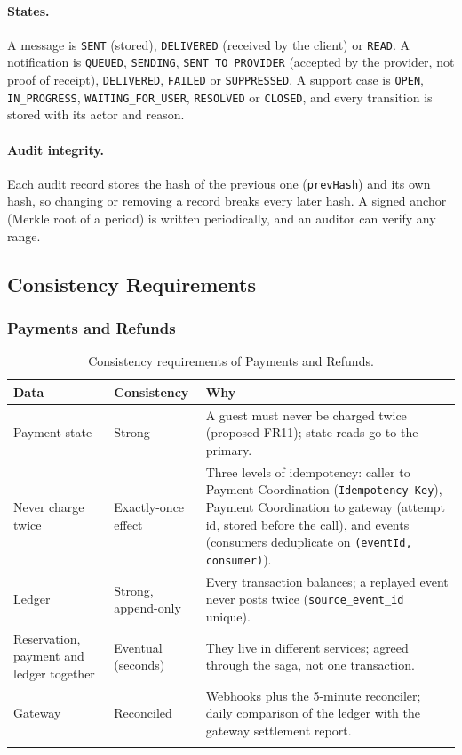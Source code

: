 \paragraph{States.} A message is \texttt{SENT} (stored), \texttt{DELIVERED}
(received by the client) or \texttt{READ}. A notification is \texttt{QUEUED},
\texttt{SENDING}, \texttt{SENT\_\allowbreak TO\_\allowbreak PROVIDER} (accepted by the
provider, not proof of receipt), \texttt{DELIVERED}, \texttt{FAILED} or
\texttt{SUPPRESSED}. A support case is \texttt{OPEN},
\texttt{IN\_\allowbreak PROGRESS}, \texttt{WAITING\_\allowbreak FOR\_\allowbreak USER},
\texttt{RESOLVED} or \texttt{CLOSED}, and every transition is stored with its
actor and reason.

\paragraph{Audit integrity.} Each audit record stores the hash of the previous
one (\texttt{prevHash}) and its own hash, so changing or removing a record
breaks every later hash. A signed anchor (Merkle root of a period) is written
periodically, and an auditor can verify any range.
\endgroup

\subsection{Consistency Requirements}

\begingroup
\setlength{\emergencystretch}{3em}
\subsubsection{Payments and Refunds}
\label{sec:pay-consistency}

\begin{longtable}{@{}L{3.2cm}L{3.6cm}L{7.0cm}@{}}
\toprule
\textbf{Data} & \textbf{Consistency} & \textbf{Why} \\
\midrule
\endhead
Payment state & Strong & A guest must never be charged twice (proposed
  FR11); state reads go to the primary. \\
Never charge twice & Exactly-once effect & Three levels of idempotency:
  caller to Payment Coordination (\texttt{Idempotency-Key}), Payment
  Coordination to gateway (attempt id, stored before the call), and events
  (consumers deduplicate on \texttt{(event\allowbreak Id, consumer)}). \\
Ledger & Strong, append-only & Every transaction balances; a replayed event
  never posts twice (\texttt{source\_\allowbreak event\_\allowbreak id} unique). \\
Reservation, payment and ledger together & Eventual (seconds) & They live in
  different services; agreed through the saga, not one transaction. \\
Gateway & Reconciled & Webhooks plus the 5-minute reconciler; daily
  comparison of the ledger with the gateway settlement report. \\
\bottomrule
\caption{Consistency requirements of Payments and Refunds.}
\label{tab:pay-consistency}
\end{longtable}
\endgroup

